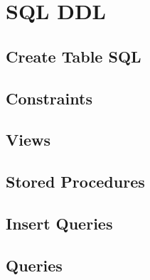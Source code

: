 \section{SQL DDL}
\subsection{Create Table SQL}
\subsection{Constraints}
\subsection{Views}
\subsection{Stored Procedures}
\subsection{Insert Queries}
\subsection{Queries}
